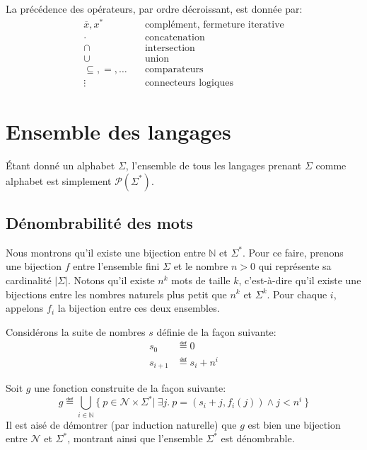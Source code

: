 La précédence des opérateurs, par ordre décroissant, est donnée par:
\begin{align*}
{\overline{x}}, x^* & \hspace{1em}\text{complément, fermeture iterative}\\
{\cdot} & \hspace{1em}\text{concatenation}\\
{\cap} & \hspace{1em}\text{intersection}\\
{\cup} & \hspace{1em}\text{union}\\
{\subseteq}, {=}, \dots & \hspace{1em}\text{comparateurs}\\
{\vdots} & \hspace{1em}\text{connecteurs logiques}
\end{align*}

\section{Ensemble des langages}

Étant donné un alphabet $\Sigma$, l'ensemble de tous les langages prenant $\Sigma$ comme alphabet est simplement $\mathcal{P}(\Sigma^*)$.

\subsection{Dénombrabilité des mots}

Nous montrons qu'il existe une bijection entre $\mathbb{N}$ et $\Sigma^*$.
Pour ce faire, prenons une bijection $f$ entre l'ensemble fini $\Sigma$ et le nombre $n > 0$ qui représente sa cardinalité $|\Sigma|$.
Notons qu'il existe $n^k$ mots de taille $k$, c'est-à-dire qu'il existe une bijections entre les nombres naturels plus petit que $n^k$ et $\Sigma^k$. Pour chaque $i$, appelons $f_i$ la bijection entre ces deux ensembles.

Considérons la suite de nombres $s$ définie de la façon suivante:
\begin{align*}
s_0 &\eqdef 0\\
s_{i + 1} &\eqdef s_i + n^i
\end{align*}

Soit $g$ une fonction construite de la façon suivante:
\[
g \eqdef \bigcup_{i \in \mathbb{N}} \{\ p \in \mathcal{N} \times \Sigma^* |\ \exists j.\ p = (s_i + j, f_i(j)) \wedge j < n^i\ \}
\]
Il est aisé de démontrer (par induction naturelle) que $g$ est bien une bijection entre $\mathcal{N}$ et $\Sigma^*$, montrant ainsi que l'ensemble $\Sigma^*$ est dénombrable.

